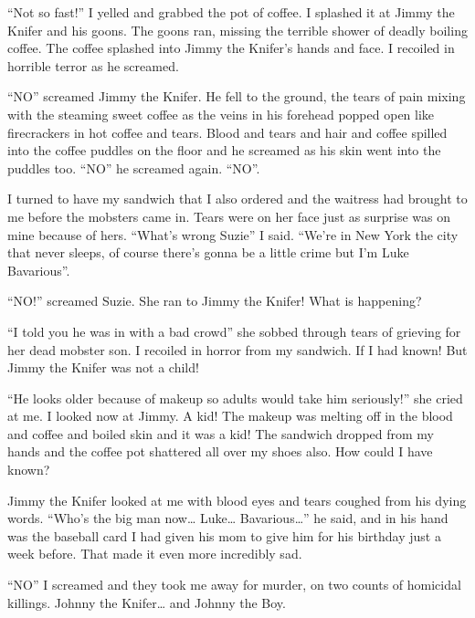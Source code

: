 ``Not so fast!'' I yelled and grabbed the pot of coffee. I splashed
it at Jimmy the Knifer and his goons. The goons ran, missing the
terrible shower of deadly boiling coffee. The coffee splashed into
Jimmy the Knifer's hands and face. I recoiled in horrible terror as
he screamed.



``NO'' screamed Jimmy the Knifer. He fell to the ground, the tears of
pain mixing with the steaming sweet coffee as the veins in his
forehead popped open like firecrackers in hot coffee and tears.
Blood and tears and hair and coffee spilled into the coffee puddles
on the floor and he screamed as his skin went into the puddles too.
``NO'' he screamed again. ``NO''.



I turned to have my sandwich that I also ordered and the waitress
had brought to me before the mobsters came in. Tears were on her
face just as surprise was on mine because of hers. ``What's wrong
Suzie'' I said. ``We're in New York the city that never sleeps, of
course there's gonna be a little crime but I'm Luke
Bavarious''.



``NO!'' screamed Suzie. She ran to Jimmy the Knifer! What is
happening?



``I told you he was in with a bad crowd'' she sobbed through tears of
grieving for her dead mobster son. I recoiled in horror from my
sandwich. If I had known! But Jimmy the Knifer was not a
child!



``He looks older because of makeup so adults would take him
seriously!'' she cried at me. I looked now at Jimmy. A kid! The
makeup was melting off in the blood and coffee and boiled skin and
it was a kid! The sandwich dropped from my hands and the coffee pot
shattered all over my shoes also. How could I have known?



Jimmy the Knifer looked at me with blood eyes and tears coughed
from his dying words. ``Who's the big man now{\ldots} Luke{\ldots}
Bavarious{\ldots}'' he said, and in his hand was the baseball card I had
given his mom to give him for his birthday just a week before. That
made it even more incredibly sad.



``NO'' I screamed and they took me away for murder, on two counts of
homicidal killings. Johnny the Knifer{\ldots} and Johnny the Boy. 

 






